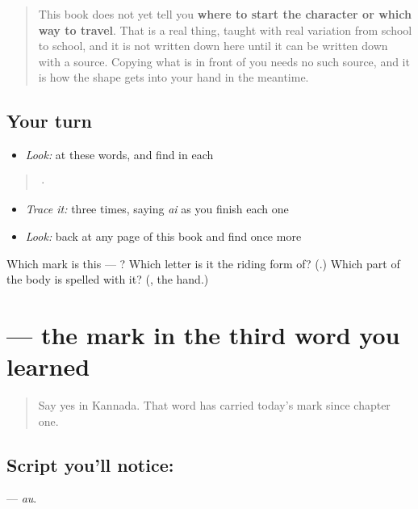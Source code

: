 \begin{quote}
This book does not yet tell you \textbf{where to start the character or which way to travel}. That is a real thing, taught with real variation from school to school, and it is not written down here until it can be written down with a source. Copying what is in front of you needs no such source, and it is how the shape gets into your hand in the meantime.
\end{quote}

\subsection*{Your turn}
\begin{itemize}
\raggedright
  \item \emph{Look:} at these words, and find  in each
\end{itemize}

\begin{quote}
  ·  
\end{quote}

\begin{itemize}
\raggedright
  \item \emph{Trace it:}  three times, saying \emph{ai} as you finish each one
  \item \emph{Look:} back at any page of this book and find  once more
\end{itemize}

\begin{tcolorbox}[breakable,colback=teal!4,colframe=teal!35!black,title={Before you move on}]
Which mark is this — ? Which letter is it the riding form of? (\textbf{}.) Which part of the body is spelled with it? (\textbf{}, the hand.)
\end{tcolorbox}
\section[\texorpdfstring{\kn{◌ೌ} (au)}{◌ೌ (au)}]{ — the mark in the third word you learned}

\label{lesson:KA-S163-vowel-sign-au}



\begin{quote}
Say yes in Kannada. That word has carried today's mark since chapter one.
\end{quote}

\subsection*{Script you'll notice: }
\textbf{} — \emph{au}.

